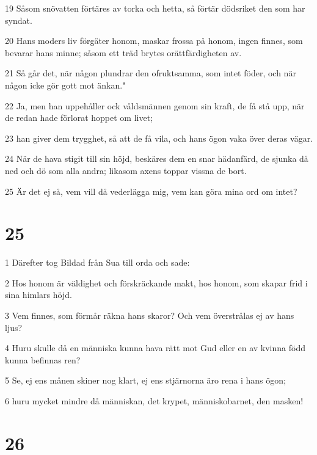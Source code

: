 \par 19 Såsom snövatten förtäres av torka och hetta, så förtär dödsriket den som har syndat.
\par 20 Hans moders liv förgäter honom, maskar frossa på honom, ingen finnes, som bevarar hans minne; såsom ett träd brytes orättfärdigheten av.
\par 21 Så går det, när någon plundrar den ofruktsamma, som intet föder, och när någon icke gör gott mot änkan."
\par 22 Ja, men han uppehåller ock våldsmännen genom sin kraft, de få stå upp, när de redan hade förlorat hoppet om livet;
\par 23 han giver dem trygghet, så att de få vila, och hans ögon vaka över deras vägar.
\par 24 När de hava stigit till sin höjd, beskäres dem en snar hädanfärd, de sjunka då ned och dö som alla andra; likasom axens toppar vissna de bort.
\par 25 Är det ej så, vem vill då vederlägga mig, vem kan göra mina ord om intet?

\chapter{25}

\par 1 Därefter tog Bildad från Sua till orda och sade:
\par 2 Hos honom är väldighet och förskräckande makt, hos honom, som skapar frid i sina himlars höjd.
\par 3 Vem finnes, som förmår räkna hans skaror? Och vem överstrålas ej av hans ljus?
\par 4 Huru skulle då en människa kunna hava rätt mot Gud eller en av kvinna född kunna befinnas ren?
\par 5 Se, ej ens månen skiner nog klart, ej ens stjärnorna äro rena i hans ögon;
\par 6 huru mycket mindre då människan, det krypet, människobarnet, den masken!

\chapter{26}


